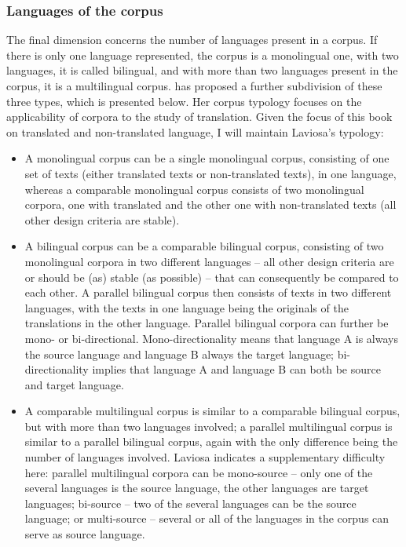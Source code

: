\subsubsection{Languages of the corpus}
\label{sec:2.2.1.3}  
The final dimension concerns the number of languages present in a corpus. If there is only one language represented, the corpus is a monolingual one, with two languages, it is called bilingual, and with more than two languages present in the corpus, it is a multilingual corpus. \citet[36--38]{laviosa_corpus-based_2002} has proposed a further subdivision of these three types, which is presented below. Her corpus typology focuses on the applicability of corpora to the study of translation. Given the focus of this book on translated and non-translated language, I will maintain Laviosa’s typology:

\begin{itemize}
\item 
A monolingual corpus can be a single monolingual corpus, consisting of one set of texts (either translated texts or non-translated texts), in one language, whereas a comparable monolingual corpus consists of two monolingual corpora, one with translated and the other one with non-translated texts (all other design criteria are stable).
\item 
A bilingual corpus can be a comparable bilingual corpus, consisting of two monolingual corpora in two different languages – all other design criteria are or should be (as) stable (as possible) – that can consequently be compared to each other. A parallel bilingual corpus then consists of texts in two different languages, with the texts in one language being the originals of the translations in the other language. Parallel bilingual corpora can further be mono- or bi-directional. Mono-directionality means that language A is always the source language and language B always the target language; bi-directionality implies that language A and language B can both be source and target language.
\item 
A comparable multilingual corpus is similar to a comparable bilingual corpus, but with more than two languages involved; a parallel multilingual corpus is similar to a parallel bilingual corpus, again with the only difference being the number of languages involved. Laviosa indicates a supplementary difficulty here: parallel multilingual corpora can be mono-source – only one of the several languages is the source language, the other languages are target languages; bi-source – two of the several languages can be the source language; or multi-source – several or all of the languages in the corpus can serve as source language.
\end{itemize}

